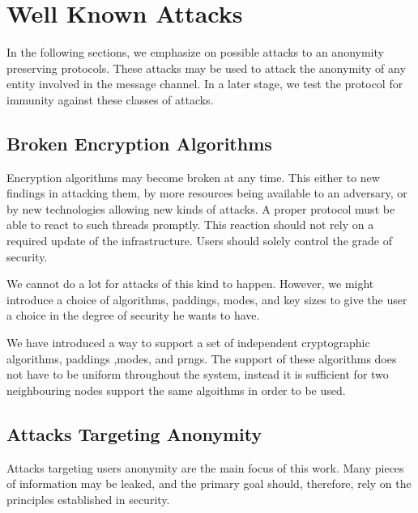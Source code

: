 \chapter{Well Known Attacks}
In the following sections, we emphasize on possible attacks to an anonymity preserving protocols. These attacks may be used to attack the anonymity of any entity involved in the message channel. In a later stage, we test the protocol for immunity against these classes of attacks.

\section{Broken Encryption Algorithms}
Encryption algorithms may become broken at any time. This either to new findings in attacking them, by more resources being available to an adversary, or by new technologies allowing new kinds of attacks. A proper protocol must be able to react to such threads promptly. This reaction should not rely on a required update of the infrastructure. Users should solely control the grade of security. 

We cannot do a lot for attacks of this kind to happen. However, we might introduce a choice of algorithms, paddings, modes, and key sizes to give the user a choice in the degree of security he wants to have.

We have introduced a way to support a set of independent cryptographic algorithms, paddings ,modes, and prngs. The support of these algorithms does not have to be uniform throughout the system, instead it is sufficient for two neighbouring nodes support the same algoithms in order to be used. 

\section{Attacks Targeting Anonymity}
Attacks targeting users anonymity are the main focus of this work. Many pieces of information may be leaked, and the primary goal should, therefore, rely on the principles established in security.

